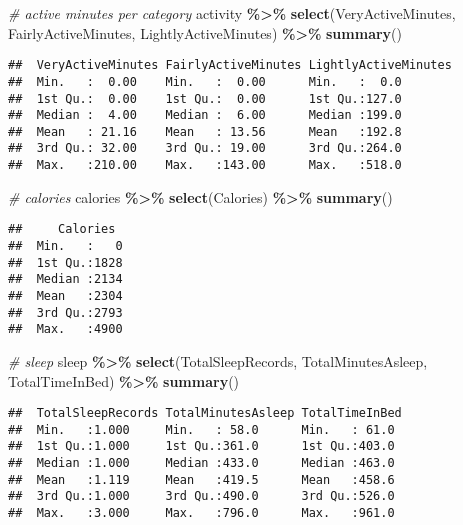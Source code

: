 \documentclass[
]{article}
\newenvironment{Shaded}{\begin{snugshade}}{\end{snugshade}}
\newcommand{\CommentTok}[1]{\textcolor[rgb]{0.56,0.35,0.01}{\textit{#1}}}
\newcommand{\FunctionTok}[1]{\textcolor[rgb]{0.13,0.29,0.53}{\textbf{#1}}}
\newcommand{\NormalTok}[1]{#1}
\newcommand{\SpecialCharTok}[1]{\textcolor[rgb]{0.81,0.36,0.00}{\textbf{#1}}}
\begin{document}
\begin{Shaded}
\begin{Highlighting}[]
\CommentTok{\# active minutes per category}
\NormalTok{activity }\SpecialCharTok{\%\textgreater{}\%}
  \FunctionTok{select}\NormalTok{(VeryActiveMinutes, FairlyActiveMinutes, LightlyActiveMinutes) }\SpecialCharTok{\%\textgreater{}\%}
  \FunctionTok{summary}\NormalTok{()}
\end{Highlighting}
\end{Shaded}

\begin{verbatim}
##  VeryActiveMinutes FairlyActiveMinutes LightlyActiveMinutes
##  Min.   :  0.00    Min.   :  0.00      Min.   :  0.0       
##  1st Qu.:  0.00    1st Qu.:  0.00      1st Qu.:127.0       
##  Median :  4.00    Median :  6.00      Median :199.0       
##  Mean   : 21.16    Mean   : 13.56      Mean   :192.8       
##  3rd Qu.: 32.00    3rd Qu.: 19.00      3rd Qu.:264.0       
##  Max.   :210.00    Max.   :143.00      Max.   :518.0
\end{verbatim}

\begin{Shaded}
\begin{Highlighting}[]
\CommentTok{\# calories}
\NormalTok{calories }\SpecialCharTok{\%\textgreater{}\%}
  \FunctionTok{select}\NormalTok{(Calories) }\SpecialCharTok{\%\textgreater{}\%}
  \FunctionTok{summary}\NormalTok{()}
\end{Highlighting}
\end{Shaded}

\begin{verbatim}
##     Calories   
##  Min.   :   0  
##  1st Qu.:1828  
##  Median :2134  
##  Mean   :2304  
##  3rd Qu.:2793  
##  Max.   :4900
\end{verbatim}

\begin{Shaded}
\begin{Highlighting}[]
\CommentTok{\# sleep}
\NormalTok{sleep }\SpecialCharTok{\%\textgreater{}\%}
  \FunctionTok{select}\NormalTok{(TotalSleepRecords, TotalMinutesAsleep, TotalTimeInBed) }\SpecialCharTok{\%\textgreater{}\%}
  \FunctionTok{summary}\NormalTok{()}
\end{Highlighting}
\end{Shaded}

\begin{verbatim}
##  TotalSleepRecords TotalMinutesAsleep TotalTimeInBed 
##  Min.   :1.000     Min.   : 58.0      Min.   : 61.0  
##  1st Qu.:1.000     1st Qu.:361.0      1st Qu.:403.0  
##  Median :1.000     Median :433.0      Median :463.0  
##  Mean   :1.119     Mean   :419.5      Mean   :458.6  
##  3rd Qu.:1.000     3rd Qu.:490.0      3rd Qu.:526.0  
##  Max.   :3.000     Max.   :796.0      Max.   :961.0
\end{verbatim}
\end{document}
